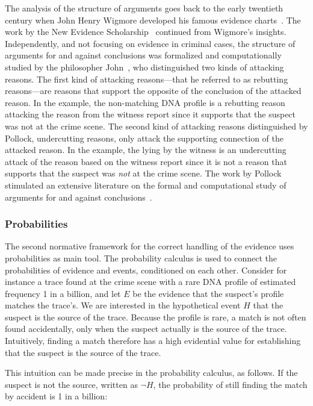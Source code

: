 \documentclass[10pt]{article}
\begin{document}
The analysis of the structure of arguments goes back to the early twentieth century when John Henry Wigmore developed his famous evidence charts~\citep{wigmore1913,wigmore1931}. The work by the New Evidence Scholarship~\citep{andersonEtal2005} continued from Wigmore's insights. Independently, and not focusing on evidence in criminal cases, the structure of arguments for and against conclusions was formalized and computationally studied by the philosopher John~\citet{pollock1987,pollock1995}, who distinguished two kinds of attacking reasons. The first kind of attacking reasons---that he referred to as rebutting reasons---are reasons that support the opposite of the conclusion of the attacked reason. In the example, the non-matching DNA profile is a rebutting reason attacking the reason from the witness report since it supports that the suspect was not at the crime scene. The second kind of attacking reasons distinguished by Pollock, undercutting reasons, only attack the supporting connection of the attacked reason. In the example, the lying by the witness is an undercutting attack of the reason based on the witness report since it is not a reason that supports that the suspect was \emph{not} at the crime scene. The work by Pollock stimulated an extensive literature on the formal and computational study of arguments for and against conclusions~\citep{vanEemerenEtal2014Ch11}.

\subsubsection{Probabilities}
The second normative framework for the correct handling of the evidence uses probabilities as main tool. The probability calculus is used to connect the probabilities of evidence and events, conditioned on each other. Consider for instance a trace found at the crime scene with a rare DNA profile of estimated frequency 1 in a billion, and let $E$ be the evidence that the suspect's profile matches the trace's. We are interested in the hypothetical event $H$ that the suspect is the source of the trace. Because the profile is rare, a match is not often found accidentally, only when the suspect actually is the source of the trace. Intuitively, finding a match therefore has a high evidential value for establishing that the suspect is the source of the trace. 

This intuition can be made precise in the probability calculus, as follows. If the suspect is not the source, written as $\neg H$, the probability of still finding the match by accident is 1 in a billion:
\end{document}
